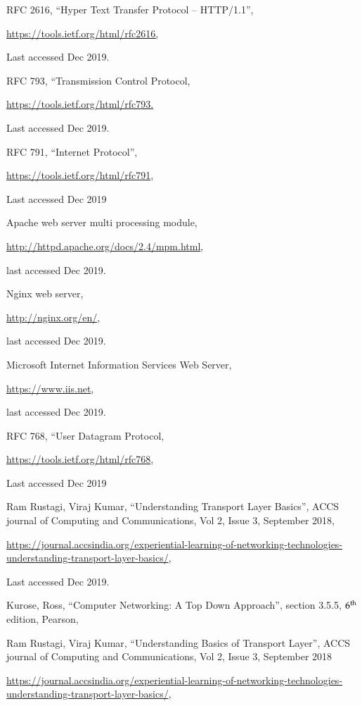\begin{multicols}{2}
\begin{thebibliography}{99}
 RFC 2616, “Hyper Text Transfer Protocol – HTTP/1.1”,

\url{https://tools.ietf.org/html/rfc2616,}

Last accessed Dec 2019.

 RFC 793, “Transmission Control Protocol,

\url{https://tools.ietf.org/html/rfc793.}

Last accessed Dec 2019.

 RFC 791, “Internet Protocol”,

\url{https://tools.ietf.org/html/rfc791},

Last accessed Dec 2019

 Apache web server multi processing module,

\url{http://httpd.apache.org/docs/2.4/mpm.html},

last accessed Dec 2019.

 Nginx web server,

\url{http://nginx.org/en/},

last accessed Dec 2019.

 Microsoft Internet Information Services Web Server,

\url{https://www.iis.net},

last accessed Dec 2019.

 RFC 768, “User Datagram Protocol,

\url{https://tools.ietf.org/html/rfc768},

Last accessed Dec 2019

  Ram Rustagi, Viraj Kumar, “Understanding Transport Layer Basics”, ACCS journal of Computing and Communications, Vol 2, Issue 3, September 2018,

\url{https://journal.accsindia.org/experiential-learning-of-networking-technologies-understanding-transport-layer-basics/},

Last accessed Dec 2019.

 Kurose, Ross, “Computer Networking: A Top Down Approach”, section 3.5.5, $6^{\rm th}$ edition, Pearson,

 Ram Rustagi, Viraj Kumar, “Understanding Basics of Transport Layer”, ACCS journal of Computing and Communications, Vol 2, Issue 3, September 2018

 \url{https://journal.accsindia.org/experiential-learning-of-networking-technologies-understanding-transport-layer-basics/},
 

\end{thebibliography}
\end{multicols}
